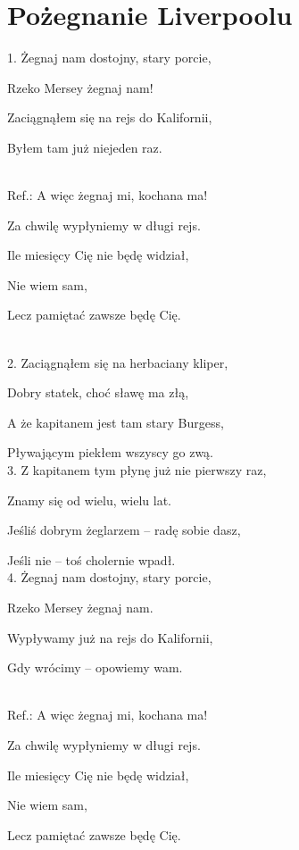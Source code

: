 \documentclass[14pt]{extarticle}%
\begin{document}
\section{
Pożegnanie Liverpoolu
}
\noindent
\begin{minipage}[t]{
0.7\textwidth
}
1. Żegnaj nam dostojny, stary porcie,

Rzeko Mersey żegnaj nam! 

Zaciągnąłem się na rejs do Kalifornii, 

Byłem tam już niejeden raz. 
\\\\
\hspace*{1cm}%
\begin{minipage}{.8\textwidth}%
Ref.: A więc żegnaj mi, kochana ma! 

Za chwilę wypłyniemy w długi rejs. 

Ile miesięcy Cię nie będę widział, 

Nie wiem sam, 

Lecz pamiętać zawsze będę Cię.
\end{minipage}%
\\

2. Zaciągnąłem się na herbaciany kliper,

Dobry statek, choć sławę ma złą,

A że kapitanem jest tam stary Burgess,

Pływającym piekłem wszyscy go zwą.\\


3. Z kapitanem tym płynę już nie pierwszy raz,

Znamy się od wielu, wielu lat.

Jeśliś dobrym żeglarzem – radę sobie dasz,

Jeśli nie – toś cholernie wpadł.\\

4. Żegnaj nam dostojny, stary porcie,

Rzeko Mersey żegnaj nam.

Wypływamy już na rejs do Kalifornii,

Gdy wrócimy – opowiemy wam.
\\\\
\hspace*{1cm}%
\begin{minipage}{.8\textwidth}%
Ref.: A więc żegnaj mi, kochana ma! 

Za chwilę wypłyniemy w długi rejs. 

Ile miesięcy Cię nie będę widział, 

Nie wiem sam, 

Lecz pamiętać zawsze będę Cię. 
\end{minipage}%
\end{minipage} %
\end{document}
